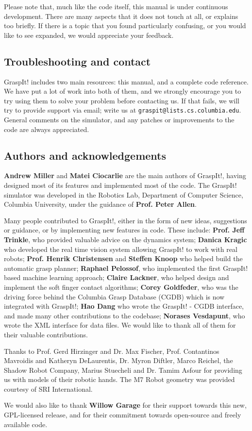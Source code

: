 Please note that, much like the code itself, this manual is under
continuous development. There are many aspects that it does not touch
at all, or explains too briefly. If there is a topic that you found
particularly confusing, or you would like to see expanded, we would
appreciate your feedback.

\subsection{Troubleshooting and contact}

GraspIt! includes two main resources: this manual, and a complete code
reference. We have put a lot of work into both of them, and we
strongly encourage you to try using them to solve your problem before
contacting us. If that fails, we will try to provide support via
email; write us at \texttt{graspit@lists.cs.columbia.edu}. General
comments on the simulator, and any patches or improvements to the code
are always appreciated.

\subsection{Authors and acknowledgements}

\textbf{Andrew Miller} and \textbf{Matei Ciocarlie} are the main
authors of GraspIt!, having designed most of its features and
implemented most of the code. The GraspIt! simulator was developed in
the Robotics Lab, Department of Computer Science, Columbia University,
under the guidance of \textbf{Prof. Peter Allen}.

Many people contributed to GraspIt!, either in the form of new ideas,
suggestions or guidance, or by implementing new features in
code. These include: \textbf{Prof. Jeff Trinkle}, who provided
valuable advice on the dynamics system; \textbf{Danica Kragic} who
developed the real time vision system allowing GraspIt! to work with
real robots; \textbf{Prof. Henrik Christensen} and \textbf{Steffen
  Knoop} who helped build the automatic grasp planner; \textbf{Raphael
  Pelossof}, who implemented the first GraspIt! based machine learning
approach; \textbf{Claire Lackner}, who helped design and implement the
soft finger contact algorithms; \textbf{Corey Goldfeder}, who was the
driving force behind the Columbia Grasp Database (CGDB) which is now
integrated with GraspIt!; \textbf{Hao Dang} who wrote the GraspIt! -
CGDB interface, and made many other contributions to the codebase;
\textbf{Norases Vesdapunt}, who wrote the XML interface for data
files. We would like to thank all of them for their valuable
contributions.

Thanks to Prof. Gerd Hirzinger and Dr. Max Fischer, Prof. Contantinos
Mavroidis and Katheryn DeLaurentis, Dr. Myron Diftler, Marco Reichel,
the Shadow Robot Company, Marius Stuecheli and Dr. Tamim Asfour for
providing us with models of their robotic hands. The M7 Robot geometry
was provided courtesy of SRI International.

We would also like to thank \textbf{Willow Garage} for their support
towards this new, GPL-licensed release, and for their commitment
towards open-source and freely available code.

